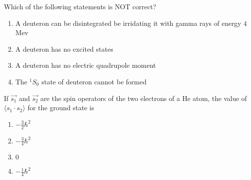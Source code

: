 \item{
Which of the following statements is NOT correct?
\begin{enumerate}
\item A deuteron can be disintegrated be irridating it with gamma rays of energy $4$Mev
\item A deuteron has no excited states
\item A deuteron has no electric quadrupole moment
\item The $^1S_0$ state of deuteron cannot be formed
\end{enumerate}
}
\item{
If $\overrightarrow{s_1}$ and $\overrightarrow{s_2}$ are the spin operators of the two electrons of a He atom, the value of $\langle s_1\cdot s_2 \rangle$ for the ground state is
\begin{multicols}{4}
\begin{enumerate}
    \item $-\frac{3}{2}\hbar^2$
    \item $-\frac{3}{4}\hbar^2$
    \item $0$
    \item $-\frac{1}{4}\hbar^2$
\end{enumerate}
\end{multicols}
}
